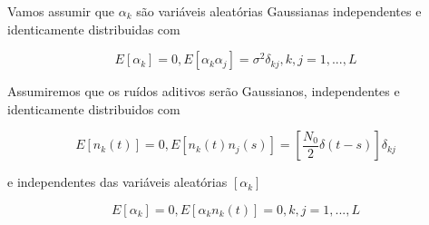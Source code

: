 \documentclass{sbrt2017port}
\begin{document}
Vamos assumir que ${\alpha_k}$ são variáveis aleatórias Gaussianas independentes e identicamente distribuidas com

\begin{equation}
 E[\alpha_k] = 0,E[\alpha_k\alpha_j] = \sigma^2\delta_{kj}, k,j = 1,...,L
 \label{eq18}
\end{equation}

Assumiremos que os ruídos aditivos serão Gaussianos, independentes e identicamente distribuidos com

\begin{equation}
 E[n_k(t)] = 0,E[n_k(t)n_j(s)] = [\frac{N_0}{2}\delta(t-s)]\delta_{kj}
 \label{eq19}
\end{equation}

e independentes das variáveis aleatórias $[\alpha_k]$

\begin{equation}
 E[\alpha_k] = 0,E[\alpha_kn_k(t)] = 0, k,j = 1,...,L
 \label{eq20}
\end{equation}
\end{document}

